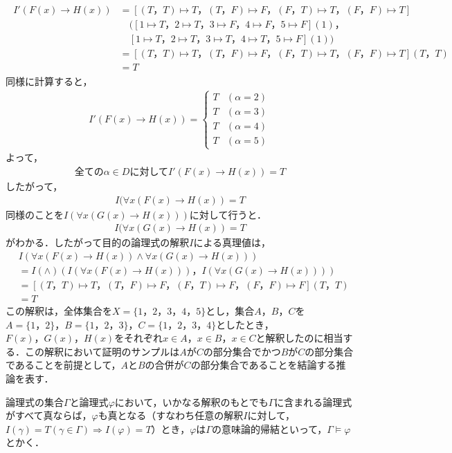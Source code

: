 \documentclass[10pt,b5paper,papersize,dvipdfmx]{jsbook}
\begin{document}
\begin{align*}
\begin{split}
I'(F(x)\to H(x))&=[(T，T)\mapsto T，(T，F)\mapsto F，(F，T)\mapsto T，(F，F)\mapsto T]\\
&\quad([1\mapsto T，2\mapsto T，3\mapsto F，4\mapsto F，5\mapsto F](1)， \\
&\quad[1\mapsto T，2\mapsto T，3\mapsto T，4\mapsto T，5\mapsto F](1))\\
&=[(T，T)\mapsto T，(T，F)\mapsto F，(F，T)\mapsto T，(F，F)\mapsto T](T，T)\\
&=T
\end{split}
\end{align*}
同様に計算すると，
\begin{align*}
I'(F(x)\to H(x))=
\begin{cases}
T&(\alpha = 2)\\
T&(\alpha = 3)\\
T&(\alpha = 4)\\
T&(\alpha = 5)
\end{cases}
\end{align*}
よって，
\begin{align*}
\mbox{全ての}\alpha \in D\mbox{に対して}I'(F(x)\to H(x))=T
\end{align*}
したがって，
\begin{align*}
I(\forall x(F(x)\to H(x))=T
\end{align*}
同様のことを$I(\forall x(G(x)\to H(x)))$に対して行うと．
\begin{align*}
I(\forall x(G(x)\to H(x))=T
\end{align*}
がわかる．したがって目的の論理式の解釈$I$による真理値は，
\begin{align*}
&I(\forall x(F(x)\to H(x))\land \forall x(G(x)\to H(x)))\\
&=I(\land)(I(\forall x(F(x)\to H(x)))，I(\forall x(G(x)\to H(x))))\\
&=[(T，T)\mapsto T，(T，F)\mapsto F，(F，T)\mapsto F，(F，F)\mapsto F](T，T)\\
&=T
\end{align*}
この解釈は，全体集合を$X=\{1，2，3，4，5\}$とし，集合$A，B，C$を$A=\{1，2\}，B=\{1，2，3\}，C=\{1，2，3，4\}$としたとき，$F(x)，G(x)，H(x)$をそれぞれ$x\in A，x\in B，x\in C$と解釈したのに相当する．この解釈において証明のサンプルは$A$が$C$の部分集合でかつ$B$が$C$の部分集合であることを前提として，$A$と$B$の合併が$C$の部分集合であることを結論する推論を表す．\par
論理式の集合$\Gamma$と論理式$\varphi$において，いかなる解釈のもとでも$\Gamma$に含まれる論理式がすべて真ならば，$\varphi$も真となる（すなわち任意の解釈$I$に対して，$I(\gamma)=T(\gamma \in \Gamma)\Rightarrow I(\varphi)=T$）とき，$\varphi$は$\Gamma$の意味論的帰結といって，$\Gamma \models \varphi$とかく．
\end{document}
